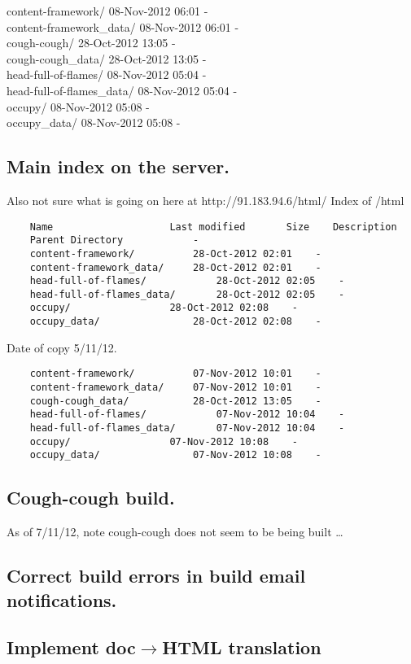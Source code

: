 \documentclass[12pt]{article}
\begin{document}
\noindent	content-framework/	08-Nov-2012 06:01	 -	\\ 
	content-framework\_data/	08-Nov-2012 06:01	 -	 \\
	cough-cough/	28-Oct-2012 13:05	 -	 \\
	cough-cough\_data/	28-Oct-2012 13:05	 -	\\ 
	head-full-of-flames/	08-Nov-2012 05:04	 -	 \\
	head-full-of-flames\_data/	08-Nov-2012 05:04	 -	 \\
	occupy/	08-Nov-2012 05:08	 -	 \\
	occupy\_data/	08-Nov-2012 05:08	 -	\\


\subsection{Main index on the server.}

Also not sure what is going on here at http://91.183.94.6/html/
Index of /html

\begin{verbatim}
	Name					Last modified		Size	Description
	Parent Directory	 	 	-	 
	content-framework/			28-Oct-2012 02:01	 -	 
	content-framework_data/		28-Oct-2012 02:01	 -	 
	head-full-of-flames/			28-Oct-2012 02:05	 -	 
	head-full-of-flames_data/		28-Oct-2012 02:05	 -	 
	occupy/					28-Oct-2012 02:08	 -	 
	occupy_data/				28-Oct-2012 02:08	 -	 
\end{verbatim}
Date of copy 5/11/12.
\begin{verbatim}
	content-framework/			07-Nov-2012 10:01	 -	 
	content-framework_data/		07-Nov-2012 10:01	 -	 
	cough-cough_data/			28-Oct-2012 13:05	 -	 
	head-full-of-flames/			07-Nov-2012 10:04	 -	 
	head-full-of-flames_data/		07-Nov-2012 10:04	 -	 
	occupy/					07-Nov-2012 10:08	 -	 
	occupy_data/				07-Nov-2012 10:08	 -	 
\end{verbatim}


\subsection{Cough-cough build.}
As of 7/11/12, note cough-cough does not seem to be being built \ldots


\subsection{Correct build errors in build email notifications.}


\subsection{Implement doc$\rightarrow$HTML translation}
\end{document}
